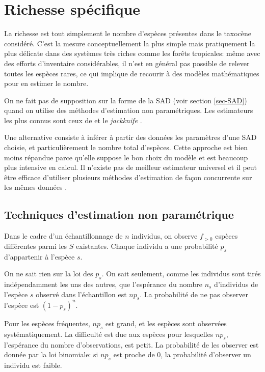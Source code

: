 \documentclass[
  11pt,
  american,
  a4paper,
  extrafontsizes,onecolumn,openright
  ]{memoir}
\begin{document}
\hypertarget{sec-Richesse}{%
\section{Richesse spécifique}\label{sec-Richesse}}

La richesse est tout simplement le nombre d'espèces présentes dans le taxocène considéré.
C'est la mesure conceptuellement la plus simple mais pratiquement la plus délicate dans des systèmes très riches comme les forêts tropicales: même avec des efforts d'inventaire considérables, il n'est en général pas possible de relever toutes les espèces rares, ce qui implique de recourir à des modèles mathématiques pour en estimer le nombre.

On ne fait pas de supposition sur la forme de la SAD (voir section \ref{sec-SAD}) quand on utilise des méthodes d'estimation non paramétriques.
Les estimateurs les plus connus sont ceux de \textcite{Chao1984} et le \emph{jackknife} \autocite{Burnham1979}.

Une alternative consiste à inférer à partir des données les paramètres d'une SAD choisie, et particulièrement le nombre total d'espèces.
Cette approche est bien moins répandue parce qu'elle suppose le bon choix du modèle et est beaucoup plus intensive en calcul.
Il n'existe pas de meilleur estimateur universel \autocite{OHara2005} et il peut être efficace d'utiliser plusieurs méthodes d'estimation de façon concurrente sur les mêmes données \autocite{Basset2012}.

\hypertarget{techniques-destimation-non-paramuxe9trique}{%
\subsection{Techniques d'estimation non paramétrique}\label{techniques-destimation-non-paramuxe9trique}}

Dans le cadre d'un échantillonnage de \(n\) individus, on observe \(f_{>0}\) espèces différentes parmi les \(S\) existantes.
Chaque individu a une probabilité \(p_s\) d'appartenir à l'espèce \(s\).

On ne sait rien sur la loi des \(p_s\).
On sait seulement, comme les individus sont tirés indépendamment les uns des autres, que l'espérance du nombre \(n_s\) d'individus de l'espèce \(s\) observé dans l'échantillon est \(np_s\).
La probabilité de ne pas observer l'espèce est \((1-p_s)^n\).

Pour les espèces fréquentes, \(np_s\) est grand, et les espèces sont observées systématiquement.
La difficulté est due aux espèces pour lesquelles \(np_s\), l'espérance du nombre d'observations, est petit.
La probabilité de les observer est donnée par la loi binomiale: si \(np_s\) est proche de 0, la probabilité d'observer un individu est faible.
\end{document}
